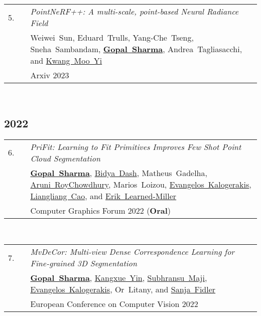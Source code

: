 \documentclass[11pt,letter,sans]{moderncv}
\begin{document}
\begin{minipage}{\textwidth}
\begin{tabular}[t]{p{8mm}p{1mm}>{\raggedright\arraybackslash}p{6.5in}}
 \hfill5.\hspace*{1mm} && \textit{PointNeRF++: A multi-scale, point-based Neural Radiance Field}  \\
 && \mbox{Weiwei Sun}, \mbox{Eduard Trulls}, \mbox{Yang-Che Tseng}, \mbox{Sneha Sambandam}, \mbox{\textbf{\href{hippogriff.github.io}{Gopal Sharma}}}, \mbox{Andrea Tagliasacchi}, and \mbox{\href{}{Kwang Moo Yi}} \\
 && Arxiv 2023  \\
\end{tabular} \\[2mm]
\end{minipage}
\subsection{2022}

\begin{minipage}{\textwidth}
\begin{tabular}[t]{p{8mm}p{1mm}>{\raggedright\arraybackslash}p{6.5in}}
 \hfill6.\hspace*{1mm} && \textit{PriFit: Learning to Fit Primitives Improves Few Shot Point Cloud Segmentation}  \\
 && \mbox{\textbf{\href{hippogriff.github.io}{Gopal Sharma}}}, \mbox{\href{}{Bidya Dash}}, \mbox{Matheus Gadelha}, \mbox{\href{}{Aruni RoyChowdhury}}, \mbox{Marios Loizou}, \mbox{\href{}{Evangelos Kalogerakis}}, \mbox{\href{}{Liangliang Cao}}, and \mbox{\href{}{Erik Learned-Miller}} \\
 && Computer Graphics Forum 2022  (\textbf{Oral})\\
\end{tabular} \\[2mm]
\end{minipage}

\begin{minipage}{\textwidth}
\begin{tabular}[t]{p{8mm}p{1mm}>{\raggedright\arraybackslash}p{6.5in}}
 \hfill7.\hspace*{1mm} && \textit{MvDeCor: Multi-view Dense Correspondence Learning for Fine-grained 3D Segmentation}  \\
 && \mbox{\textbf{\href{hippogriff.github.io}{Gopal Sharma}}}, \mbox{\href{}{Kangxue Yin}}, \mbox{\href{}{Subhransu Maji}}, \mbox{\href{}{Evangelos Kalogerakis}}, \mbox{Or Litany}, and \mbox{\href{}{Sanja Fidler}} \\
 && European Conference on Computer Vision 2022  \\
\end{tabular} \\[2mm]
\end{minipage}
\end{document}
